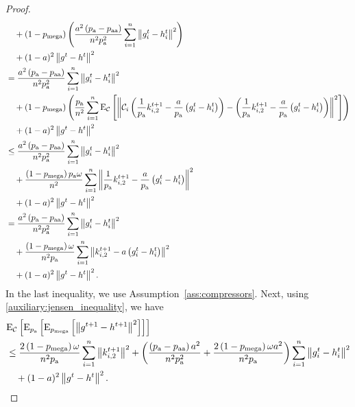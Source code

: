 \documentclass{article}
\newcommand*{\probavailable}{\ensuremath{p_{\textnormal{a}}}}
\newcommand*{\probpairaa}{\ensuremath{p_{\textnormal{aa}}}}
\newcommand*{\probmega}{\ensuremath{p_{\text{mega}}}}
\begin{document}
\begin{proof}
\begin{align*}
    &\quad + \left(1 - \probmega\right) \left(\frac{a^2 \left(\probavailable - \probpairaa\right)}{n^2 \probavailable^2}\sum_{i=1}^n\norm{g^t_i - h^{t}_i}^2\right) \\
    &\quad + (1 - a)^2\norm{g^{t} - h^{t}}^2 \\
    &= \frac{a^2\left(\probavailable - \probpairaa\right)}{n^2 \probavailable^2}\sum_{i=1}^n\norm{g^{t}_i - h^{t}_i}^2 \\
    &\quad + \left(1 - \probmega\right) \left(\frac{\probavailable}{n^2}\sum_{i=1}^n\ExpSub{\cC}{\norm{\cC_i\left(\frac{1}{\probavailable}k^{t+1}_{i, 2} - \frac{a}{\probavailable} \left(g^t_i - h^{t}_i\right)\right) - \left(\frac{1}{\probavailable}k^{t+1}_{i, 2} - \frac{a}{\probavailable}\left(g^t_i - h^{t}_i\right)\right)}^2}\right)\\
    &\quad + (1 - a)^2\norm{g^{t} - h^{t}}^2 \\
    &\leq \frac{a^2\left(\probavailable - \probpairaa\right)}{n^2 \probavailable^2}\sum_{i=1}^n\norm{g^{t}_i - h^{t}_i}^2 \\
    &\quad + \frac{\left(1 - \probmega\right) \probavailable \omega}{n^2}\sum_{i=1}^n\norm{\frac{1}{\probavailable}k^{t+1}_{i, 2} - \frac{a}{\probavailable}\left(g^t_i - h^{t}_i\right)}^2\\
    &\quad + (1 - a)^2\norm{g^{t} - h^{t}}^2 \\
    &= \frac{a^2\left(\probavailable - \probpairaa\right)}{n^2 \probavailable^2}\sum_{i=1}^n\norm{g^{t}_i - h^{t}_i}^2 \\
    &\quad + \frac{\left(1 - \probmega\right) \omega}{n^2 \probavailable}\sum_{i=1}^n\norm{k^{t+1}_{i, 2} - a\left(g^t_i - h^{t}_i\right)}^2\\
    &\quad + (1 - a)^2\norm{g^{t} - h^{t}}^2.
  \end{align*}
  In the last inequality, we use Assumption~\ref{ass:compressors}. Next, using \eqref{auxiliary:jensen_inequality}, we have
  \begin{align*}
    &\ExpSub{\cC}{\ExpSub{\probavailable}{\ExpSub{\probmega}{\norm{g^{t+1} - h^{t+1}}^2}}} \\
    &\leq \frac{2 \left(1 - \probmega\right) \omega}{n^2 \probavailable}\sum_{i=1}^n\norm{k^{t+1}_{i, 2}}^2 + \left(\frac{\left(\probavailable - \probpairaa\right)a^2}{n^2 \probavailable^2} + \frac{2 \left(1 - \probmega\right) \omega a^2}{n^2 \probavailable}\right)\sum_{i=1}^n\norm{g^{t}_i - h^{t}_i}^2 \\
    &\quad + (1 - a)^2\norm{g^{t} - h^{t}}^2.
  \end{align*}

\end{proof}
\end{document}
